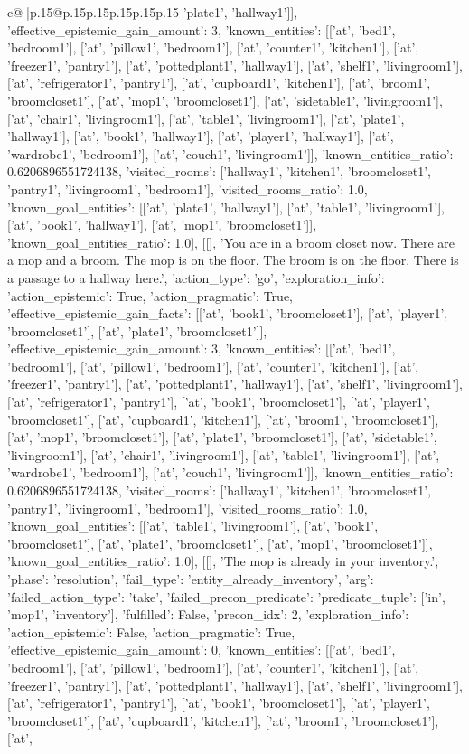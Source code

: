 \documentclass{article}
\begin{document}
{\begin{supertabular}{c@{$\;$}|p{.15\linewidth}@{}p{.15\linewidth}p{.15\linewidth}p{.15\linewidth}p{.15\linewidth}p{.15\linewidth}}
{{{'plate1', 'hallway1']], 'effective_epistemic_gain_amount': 3, 'known_entities': [['at', 'bed1', 'bedroom1'], ['at', 'pillow1', 'bedroom1'], ['at', 'counter1', 'kitchen1'], ['at', 'freezer1', 'pantry1'], ['at', 'pottedplant1', 'hallway1'], ['at', 'shelf1', 'livingroom1'], ['at', 'refrigerator1', 'pantry1'], ['at', 'cupboard1', 'kitchen1'], ['at', 'broom1', 'broomcloset1'], ['at', 'mop1', 'broomcloset1'], ['at', 'sidetable1', 'livingroom1'], ['at', 'chair1', 'livingroom1'], ['at', 'table1', 'livingroom1'], ['at', 'plate1', 'hallway1'], ['at', 'book1', 'hallway1'], ['at', 'player1', 'hallway1'], ['at', 'wardrobe1', 'bedroom1'], ['at', 'couch1', 'livingroom1']], 'known_entities_ratio': 0.6206896551724138, 'visited_rooms': ['hallway1', 'kitchen1', 'broomcloset1', 'pantry1', 'livingroom1', 'bedroom1'], 'visited_rooms_ratio': 1.0, 'known_goal_entities': [['at', 'plate1', 'hallway1'], ['at', 'table1', 'livingroom1'], ['at', 'book1', 'hallway1'], ['at', 'mop1', 'broomcloset1']], 'known_goal_entities_ratio': 1.0}}], [[], 'You are in a broom closet now. There are a mop and a broom. The mop is on the floor. The broom is on the floor. There is a passage to a hallway here.', {'action_type': 'go', 'exploration_info': {'action_epistemic': True, 'action_pragmatic': True, 'effective_epistemic_gain_facts': [['at', 'book1', 'broomcloset1'], ['at', 'player1', 'broomcloset1'], ['at', 'plate1', 'broomcloset1']], 'effective_epistemic_gain_amount': 3, 'known_entities': [['at', 'bed1', 'bedroom1'], ['at', 'pillow1', 'bedroom1'], ['at', 'counter1', 'kitchen1'], ['at', 'freezer1', 'pantry1'], ['at', 'pottedplant1', 'hallway1'], ['at', 'shelf1', 'livingroom1'], ['at', 'refrigerator1', 'pantry1'], ['at', 'book1', 'broomcloset1'], ['at', 'player1', 'broomcloset1'], ['at', 'cupboard1', 'kitchen1'], ['at', 'broom1', 'broomcloset1'], ['at', 'mop1', 'broomcloset1'], ['at', 'plate1', 'broomcloset1'], ['at', 'sidetable1', 'livingroom1'], ['at', 'chair1', 'livingroom1'], ['at', 'table1', 'livingroom1'], ['at', 'wardrobe1', 'bedroom1'], ['at', 'couch1', 'livingroom1']], 'known_entities_ratio': 0.6206896551724138, 'visited_rooms': ['hallway1', 'kitchen1', 'broomcloset1', 'pantry1', 'livingroom1', 'bedroom1'], 'visited_rooms_ratio': 1.0, 'known_goal_entities': [['at', 'table1', 'livingroom1'], ['at', 'book1', 'broomcloset1'], ['at', 'plate1', 'broomcloset1'], ['at', 'mop1', 'broomcloset1']], 'known_goal_entities_ratio': 1.0}}], [[], 'The mop is already in your inventory.', {'phase': 'resolution', 'fail_type': 'entity_already_inventory', 'arg': {'failed_action_type': 'take', 'failed_precon_predicate': {'predicate_tuple': ['in', 'mop1', 'inventory'], 'fulfilled': False, 'precon_idx': 2}}, 'exploration_info': {'action_epistemic': False, 'action_pragmatic': True, 'effective_epistemic_gain_amount': 0, 'known_entities': [['at', 'bed1', 'bedroom1'], ['at', 'pillow1', 'bedroom1'], ['at', 'counter1', 'kitchen1'], ['at', 'freezer1', 'pantry1'], ['at', 'pottedplant1', 'hallway1'], ['at', 'shelf1', 'livingroom1'], ['at', 'refrigerator1', 'pantry1'], ['at', 'book1', 'broomcloset1'], ['at', 'player1', 'broomcloset1'], ['at', 'cupboard1', 'kitchen1'], ['at', 'broom1', 'broomcloset1'], ['at', }}}
\end{supertabular}}
\end{document}
